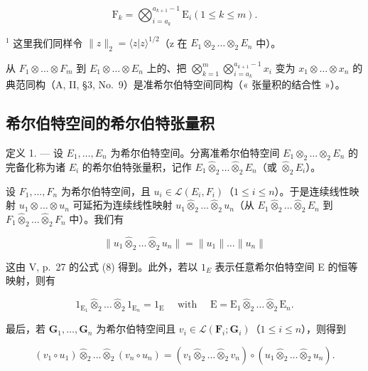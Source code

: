 \[
\mathrm{F} _ {k} = \bigotimes_ {i = a _ {k}} ^ {a _ {k + 1} - 1} \mathrm{E} _ {i} (1 \leqslant k \leqslant m).
\]

\(^{1}\) 这里我们同样令 \(\|z\|_{2} = \langle z|z\rangle^{1/2}\)（z 在 \(E_{1} \otimes_{2} \ldots \otimes_{2} E_{n}\) 中）。

从 \(F_{1} \otimes \ldots \otimes F_{m}\) 到 \(E_{1} \otimes \ldots \otimes E_{n}\) 上的、把 \(\bigotimes_{k=1}^{m} \bigotimes_{i=a_{k}}^{a_{k+1}-1} x_{i}\) 变为 \(x_{1} \otimes \ldots \otimes x_{n}\) 的典范同构（A, II, §3, No.~9）是准希尔伯特空间同构（« 张量积的结合性 »）。

\subsection{希尔伯特空间的希尔伯特张量积}

定义 1. --- 设 \(E_{1}, \ldots, E_{n}\) 为希尔伯特空间。分离准希尔伯特空间 \(E_{1} \otimes_{2} \ldots \otimes_{2} E_{n}\) 的完备化称为诸 \(E_{i}\) 的希尔伯特张量积，记作 \(E_{1} \hat{\otimes}_{2} \ldots \hat{\otimes}_{2} E_{n}\)（或 \(\hat{\otimes}_{2} E_{i}\)）。

设 \(F_{1}, \ldots, F_{n}\) 为希尔伯特空间，且 \(u_{i} \in \mathcal{L}(E_{i}, F_{i})\)（\(1 \leqslant i \leqslant n\)）。于是连续线性映射 \(u_{1} \otimes \ldots \otimes u_{n}\) 可延拓为连续线性映射 \(u_{1} \hat{\otimes}_{2} \ldots \hat{\otimes}_{2} u_{n}\)（从 \(E_{1} \hat{\otimes}_{2} \ldots \hat{\otimes}_{2} E_{n}\) 到 \(F_{1} \hat{\otimes}_{2} \ldots \hat{\otimes}_{2} F_{n}\) 中）。我们有

\[
\| u _ {1} \hat {\otimes} _ {2} \dots \hat {\otimes} _ {2} u _ {n} \| = \| u _ {1} \| \dots \| u _ {n} \|\tag{10}
\]

这由 V, p.~27 的公式 (8) 得到。此外，若以 \(1_{E}\) 表示任意希尔伯特空间 E 的恒等映射，则有

\[
1 _ {\mathrm{E} _ {1}} \hat {\otimes} _ {2} \dots \hat {\otimes} _ {2} 1 _ {\mathrm{E} _ {n}} = 1 _ {\mathrm{E}} \quad \text { with } \quad \mathrm{E} = \mathrm{E} _ {1} \hat {\otimes} _ {2} \dots \hat {\otimes} _ {2} \mathrm{E} _ {n}.\tag{11}
\]

最后，若 \(\mathbf{G}_1, \ldots, \mathbf{G}_n\) 为希尔伯特空间且 \(v_i \in \mathcal{L}(\mathbf{F}_i; \mathbf{G}_i)\)（\(1 \leqslant i \leqslant n\)），则得到

\[
\left(v _ {1} \circ u _ {1}\right) \hat {\otimes} _ {2} \dots \hat {\otimes} _ {2} \left(v _ {n} \circ u _ {n}\right) = \left(v _ {1} \hat {\otimes} _ {2} \dots \hat {\otimes} _ {2} v _ {n}\right) \circ \left(u _ {1} \hat {\otimes} _ {2} \dots \hat {\otimes} _ {2} u _ {n}\right).\tag{12}
\]

